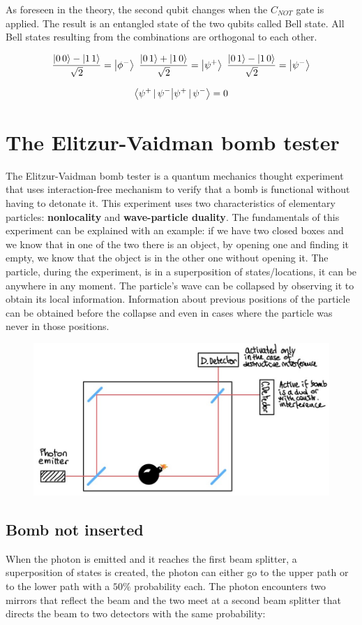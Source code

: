 	As foreseen in the theory, the second qubit changes when the $C_{NOT}$ gate is applied.
	The result is an entangled state of the two qubits called Bell state.
	All Bell states resulting from the combinations are orthogonal to each other.

	$$\frac{\ket{0\,0}-\ket{1\,1}}{\sqrt{2}}=\ket{\phi^-}\,\,\frac{\ket{0\,1}+\ket{1\,0}}{\sqrt{2}}=\ket{\psi^+}\,\,\frac{\ket{0\,1}-\ket{1\,0}}{\sqrt{2}}=\ket{\psi^-}$$

	$$\braket{\psi^+\,|\,\psi^-}=0$$

\section{The Elitzur-Vaidman bomb tester}
The Elitzur-Vaidman bomb tester is a quantum mechanics thought experiment that uses interaction-free mechanism to verify that a bomb is functional without having to detonate it.
This experiment uses two characteristics of elementary particles: \textbf{nonlocality} and \textbf{wave-particle duality}.
The fundamentals of this experiment can be explained with an example: if we have two closed boxes and we know that in one of the two there is an object, by opening one and finding it empty, we know that the object is in the other one without opening it.
The particle, during the experiment, is in a superposition of states/locations, it can be anywhere in any moment.
The particle's wave can be collapsed by observing it to obtain its local information.
Information about previous positions of the particle can be obtained before the collapse and even in cases where the particle was never in those positions.

\begin{figure}[htbp!]
	\centering
	\includegraphics[scale=0.30]{img_12}
\end{figure}


	\subsection{Bomb not inserted}
When the photon is emitted and it reaches the first beam splitter, a superposition of states is created, the photon can either go to the upper path or to the lower path with a $50\%$ probability each.
The photon encounters two mirrors that reflect the beam and the two meet at a second beam splitter that directs the beam to two detectors with the same probability:

